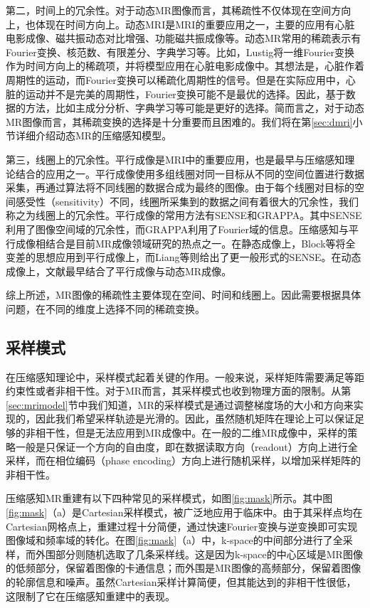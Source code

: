 第二，时间上的冗余性。对于动态MR图像而言，其稀疏性不仅体现在空间方向上，也体现在时间方向上。动态MRI是MRI的重要应用之一，主要的应用有心脏电影成像、磁共振动态对比增强、功能磁共振成像等。动态MR常用的稀疏表示有Fourier变换、核范数、有限差分、字典学习等。比如，Lustig\cite{lustig2006}将一维Fourier变换作为时间方向上的稀疏项，并将模型应用在心脏电影成像中。其想法是，心脏作着周期性的运动，而Fourier变换可以稀疏化周期性的信号。但是在实际应用中，心脏的运动并不是完美的周期性，Fourier变换可能不是最优的选择。因此，基于数据的方法，比如主成分分析、字典学习等可能是更好的选择。简而言之，对于动态MR图像而言，其稀疏变换的选择是十分重要而且困难的。我们将在第\ref{sec:dmri}小节详细介绍动态MR的压缩感知模型。

第三，线圈上的冗余性。平行成像是MRI中的重要应用，也是最早与压缩感知理论结合的应用之一。平行成像使用多组线圈对同一目标从不同的空间位置进行数据采集，再通过算法将不同线圈的数据合成为最终的图像。由于每个线圈对目标的空间感受性（sensitivity）不同，线圈所采集到的数据之间有着很大的冗余性，我们称之为线圈上的冗余性。平行成像的常用方法有SENSE\cite{sense}和GRAPPA\cite{grappa}。其中SENSE利用了图像空间域的冗余性，而GRAPPA利用了Fourier域的信息。压缩感知与平行成像相结合是目前MR成像领域研究的热点之一。在静态成像上，Block等\cite{block2007undersampled}将全变差的思想应用到平行成像上，而Liang\cite{liang2009accelerating}等则给出了更一般形式的SENSE。在动态成像上，文献\cite{igrasp,focuss}最早结合了平行成像与动态MR成像。

综上所述，MR图像的稀疏性主要体现在空间、时间和线圈上。因此需要根据具体问题，在不同的维度上选择不同的稀疏变换。

\subsection{采样模式}
在压缩感知理论中，采样模式起着关键的作用。一般来说，采样矩阵需要满足等距约束性或者非相干性。对于MR而言，其采样模式也收到物理方面的限制。从第\ref{sec:mrimodel}节中我们知道，MR的采样模式是通过调整梯度场的大小和方向来实现的，因此我们希望采样轨迹是光滑的。因此，虽然随机矩阵在理论上可以保证足够的非相干性，但是无法应用到MR成像中。在一般的二维MR成像中，采样的策略一般是只保证一个方向的自由度，即在数据读取方向（readout）方向上进行全采样，而在相位编码（phase encoding）方向上进行随机采样，以增加采样矩阵的非相干性。

压缩感知MR重建有以下四种常见的采样模式，如图\ref{fig:mask}所示。其中图\ref{fig:mask}（a）是Cartesian采样模式，被广泛地应用于临床中。由于其采样点均在Cartesian网格点上，重建过程十分简便，通过快速Fourier变换与逆变换即可实现图像域和频率域的转化。在图\ref{fig:mask}（a）中，k-space的中间部分进行了全采样，而外围部分则随机选取了几条采样线。这是因为k-space的中心区域是MR图像的低频部分，保留着图像的卡通信息；而外围是MR图像的高频部分，保留着图像的轮廓信息和噪声。虽然Cartesian采样计算简便，但其能达到的非相干性很低，这限制了它在压缩感知重建中的表现。

